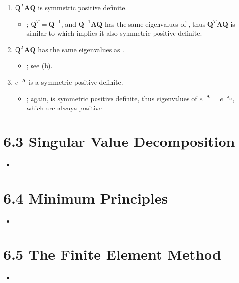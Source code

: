 \begin{itemize}
\begin{enumerate}
{\begin{enumerate}
        \item \(\bm{Q}^T \bm{AQ}\) is symmetric positive definite.
        \begin{itemize}\color{foreground}
          \item {}; \(\bm{Q}^T = \bm{Q}^{-1}\), and \(\bm{Q}^{-1}
            \bm{AQ}\) has the same eigenvalues of , thus \(\bm{Q}^T
            \bm{AQ} \) is similar to  which implies it also symmetric
            positive definite.
        \end{itemize}

        \item \(\bm{Q}^T \bm{AQ}\) has the same eigenvalues as .
        \begin{itemize}\color{foreground}
          \item {}; see (b).
        \end{itemize}

        \item \(e^{-\bm{A}} \) is a symmetric positive definite.
        \begin{itemize}\color{foreground}
          \item {}; again,  is symmetric positive definite,
            thus eigenvalues of \(e^{-\bm{A}} = e^{-\lambda_{ii} } \), which
            are always positive.
        \end{itemize}

      \end{enumerate}
    }
  \end{enumerate}
\end{itemize}

\section{6.3 Singular Value Decomposition}
\begin{itemize}
  \item []


\end{itemize}

\section{6.4 Minimum Principles}
\begin{itemize}
  \item []


\end{itemize}

\section{6.5 The Finite Element Method}
\begin{itemize}
  \item []


\end{itemize}
